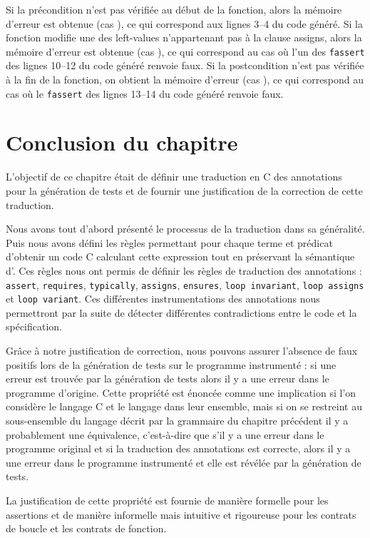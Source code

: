 Si la précondition n'est pas vérifiée au début de la fonction, alors
la mémoire d'erreur est obtenue (cas ), ce qui correspond aux
lignes 3--4 du code généré.
Si la fonction modifie une des left-values n'appartenant pas à la clause
assigns, alors la mémoire d'erreur est obtenue (cas ), ce qui
correspond au cas où l'un des \lstinline'fassert' des lignes 10--12 du code
généré renvoie faux.
Si la postcondition n'est pas vérifiée à la fin de la fonction, on obtient
la mémoire d'erreur (cas ), ce qui correspond au cas où le
\lstinline'fassert' des lignes 13--14 du code généré renvoie faux.


\section*{Conclusion du chapitre}

L'objectif de ce chapitre était de définir une traduction en C des annotations
\eacsl pour la génération de tests et de fournir une justification de la
correction de cette traduction.

Nous avons tout d'abord présenté le processus de la traduction dans sa
généralité.
Puis nous avons défini les règles permettant pour chaque terme et prédicat
\eacsl d'obtenir un code C calculant cette expression tout en préservant la
sémantique d'\eacsl.
Ces règles nous ont permis de définir les règles de traduction des annotations
\eacsl : \lstinline'assert', \lstinline'requires',
\lstinline'typically', \lstinline'assigns', \lstinline'ensures',
\lstinline'loop invariant', \lstinline'loop assigns' et
\lstinline'loop variant'.
Ces différentes instrumentations des annotations nous permettront par la suite
de détecter différentes contradictions entre le code et la spécification.

Grâce à notre justification de correction, nous pouvons assurer l'absence de
faux positifs lors de la génération de tests sur le programme instrumenté : si
une erreur est trouvée par la génération de tests alors il y a une erreur dans
le programme d'origine.
Cette propriété est énoncée comme une implication si l'on considère le langage
C et le langage \eacsl dans leur ensemble, mais si on se restreint au
sous-ensemble du langage décrit par la grammaire du chapitre précédent il y a
probablement une équivalence, c'est-à-dire que s'il y a une erreur dans le
programme original et si la traduction des annotations \eacsl est correcte,
alors il y a une erreur dans le programme instrumenté et elle est révélée par la
génération de tests.

La justification de cette propriété est fournie de manière formelle pour les
assertions et de manière informelle mais intuitive et rigoureuse pour les
contrats de boucle et les contrats de fonction.
